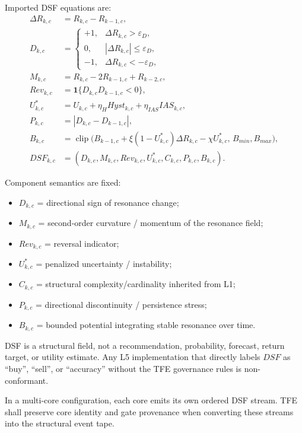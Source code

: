 \documentclass[11pt]{report}
\newcommand{\clip}{\operatorname{clip}}
\begin{document}
Imported DSF equations are:
\begin{align*}
\Delta R_{k,c} &= R_{k,c}-R_{k-1,c},\\
D_{k,c} &= \begin{cases}+1,& \Delta R_{k,c}>\varepsilon_D,\\0,& |\Delta R_{k,c}|\le \varepsilon_D,\\-1,& \Delta R_{k,c}< -\varepsilon_D,\end{cases}\\
M_{k,c} &= R_{k,c}-2R_{k-1,c}+R_{k-2,c},\\
Rev_{k,c} &= \mathbf{1}\{D_{k,c}D_{k-1,c}<0\},\\
U^{\ast}_{k,c} &= U_{k,c} + \eta_HHyst_{k,c} + \eta_{IAS}IAS_{k,c},\\
P_{k,c} &= |D_{k,c}-D_{k-1,c}|,\\
B_{k,c} &= \clip\big(B_{k-1,c}+\xi(1-U^{\ast}_{k,c})\Delta R_{k,c}-\chi U^{\ast}_{k,c},\,B_{min},B_{max}\big),\\
DSF_{k,c} &= (D_{k,c},M_{k,c},Rev_{k,c},U^{\ast}_{k,c},C_{k,c},P_{k,c},B_{k,c}).
\end{align*}

Component semantics are fixed:
\begin{itemize}
    \item $D_{k,c}$ = directional sign of resonance change;
    \item $M_{k,c}$ = second-order curvature / momentum of the resonance field;
    \item $Rev_{k,c}$ = reversal indicator;
    \item $U^{\ast}_{k,c}$ = penalized uncertainty / instability;
    \item $C_{k,c}$ = structural complexity/cardinality inherited from L1;
    \item $P_{k,c}$ = directional discontinuity / persistence stress;
    \item $B_{k,c}$ = bounded potential integrating stable resonance over time.
\end{itemize}

DSF is a structural field, not a recommendation, probability, forecast, return target, or utility estimate. Any L5 implementation that directly labels $DSF$ as ``buy'', ``sell'', or ``accuracy'' without the TFE governance rules is non-conformant.

In a multi-core configuration, each core emits its own ordered DSF stream. TFE shall preserve core identity and gate provenance when converting these streams into the structural event tape.
\end{document}
